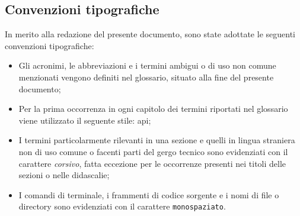 \subsection{Convenzioni tipografiche}
\label{sec:convenzioni-tipografiche}

In merito alla redazione del presente documento, sono state adottate le seguenti convenzioni tipografiche:
\begin{itemize}
	\item Gli acronimi, le abbreviazioni e i termini ambigui o di uso non comune menzionati vengono definiti nel glossario, situato alla fine del presente documento;

	\item Per la prima occorrenza in ogni capitolo dei termini riportati nel glossario viene utilizzato il seguente stile: \gls{api};

	\item I termini particolarmente rilevanti in una sezione e quelli in lingua straniera non di uso comune o facenti parti del gergo tecnico sono evidenziati con il carattere \emph{corsivo}, fatta eccezione per le occorrenze presenti nei titoli delle sezioni o nelle didascalie;

	\item I comandi di terminale, i frammenti di codice sorgente e i nomi di file o directory sono evidenziati con il carattere \texttt{monospaziato}.

\end{itemize}
